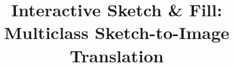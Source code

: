 \documentclass[10pt,twocolumn,letterpaper]{article}
\begin{document}
\title{Interactive Sketch \& Fill: Multiclass Sketch-to-Image Translation}


\end{document}
